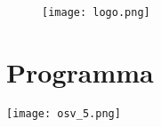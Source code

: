 \documentclass[10pt,twoside,openright,x11names,svgnames,italian,a4paper,dvipsnames,table]{memoir}
\begin{document}
\vspace*{\fill}
\begin{figure}[!h]
\centering
\texttt{[image: logo.png]}
\end{figure}

\part{Programma}
\pagestyle{CIOpage}
\addtocounter{figure}{1}
\addtocounter{table}{1}
\begin{center}
\vspace*{\fill}
\texttt{[image: osv\_5.png]}
\vspace*{\fill}
\end{center}
\afterpage{\restorepagecolor}
\end{document}

